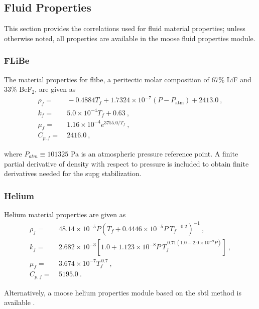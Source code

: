 \begin{appendices}
\subsection*{Fluid Properties}

This section provides the correlations used for fluid material properties; unless otherwise noted, all properties are available in the \gls{moose} fluid properties module.

\subsubsection*{FLiBe}
The material properties for \gls{flibe}, a peritectic molar composition of 67\% LiF and 33\% BeF$_2$, are given as \cite{richard,romatoski}
\begin{subequations}
\label{eq:flibe}
\begin{align}
\rho_f=&\ -0.4884T_f+1.7324\times10^{-7}(P-P_\text{atm})+2413.0\ ,\\
k_f=&\ 5.0\times10^{-4}T_f+0.63\ ,\\
\mu_f=&\ 1.16\times10^{-4}e^{3755.0/T_f}\ ,\\
C_{p,f}=&\ 2416.0\ ,
\end{align}
\end{subequations}

\noindent where \(P_{atm}\equiv101325\) \si{\pascal} is an atmospheric pressure reference point. A finite partial derivative of density with respect to pressure is included to obtain finite derivatives needed for the \gls{supg} stabilization. 

\subsubsection*{Helium}
Helium material properties are given as \cite{petersen}
\begin{subequations}
\label{eq:helium}
\begin{align}
\rho_f=&\ 48.14\times10^{-5}P\left(T_f+0.4446\times10^{-5}P\ T_f^{\ -0.2}\right)^{-1}\ ,\\
k_f=&\ 2.682\times10^{-3}\left\lbrack1.0 + 1.123\times10^{-8}P\ T_f^{\ 0.71(1.0 - 2.0\times10^{-9}P)}\right\rbrack\ ,\\
\mu_f=&\ 3.674\times10^{-7}T_f^{\ 0.7}\ ,\\
C_{p,f}=&\ 5195.0\ .
\end{align}
\end{subequations}

\noindent Alternatively, a \gls{moose} helium properties module based on the \gls{sbtl} method is available \cite{kunick}.


\end{appendices}
